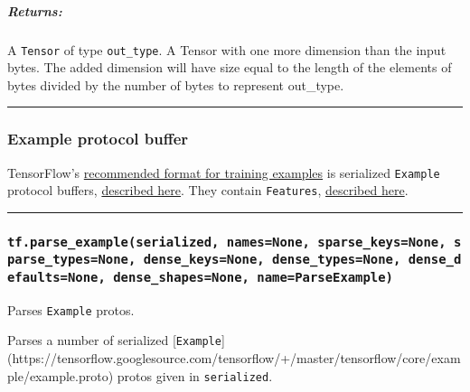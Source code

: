 \subparagraph{Returns: }\label{returns-38}

A \texttt{Tensor} of type \texttt{out\_type}. A Tensor with one more
dimension than the input bytes. The added dimension will have size equal
to the length of the elements of bytes divided by the number of bytes to
represent out\_type.

\begin{center}\rule{0.5\linewidth}{\linethickness}\end{center}

\subsubsection{Example protocol buffer }\label{example-protocol-buffer}

TensorFlow's
\href{../../how_tos/reading_data/index.md\#standard-tensorflow-format}{recommended
format for training examples} is serialized \texttt{Example} protocol
buffers,
\href{https://tensorflow.googlesource.com/tensorflow/+/master/tensorflow/core/example/example.proto}{described
here}. They contain \texttt{Features},
\href{https://tensorflow.googlesource.com/tensorflow/+/master/tensorflow/core/example/feature.proto}{described
here}.

\begin{center}\rule{0.5\linewidth}{\linethickness}\end{center}

\subsubsection{\texorpdfstring{\texttt{tf.parse\_example(serialized,\ names=None,\ sparse\_keys=None,\ sparse\_types=None,\ dense\_keys=None,\ dense\_types=None,\ dense\_defaults=None,\ dense\_shapes=None,\ name=\textquotesingle{}ParseExample\textquotesingle{})}
}{tf.parse\_example(serialized, names=None, sparse\_keys=None, sparse\_types=None, dense\_keys=None, dense\_types=None, dense\_defaults=None, dense\_shapes=None, name='ParseExample') }}\label{tf.parseux5fexampleserialized-namesnone-sparseux5fkeysnone-sparseux5ftypesnone-denseux5fkeysnone-denseux5ftypesnone-denseux5fdefaultsnone-denseux5fshapesnone-nameparseexample}

Parses \texttt{Example} protos.

Parses a number of serialized {[}\texttt{Example}{]}
(https://tensorflow.googlesource.com/tensorflow/+/master/tensorflow/core/example/example.proto)
protos given in \texttt{serialized}.

